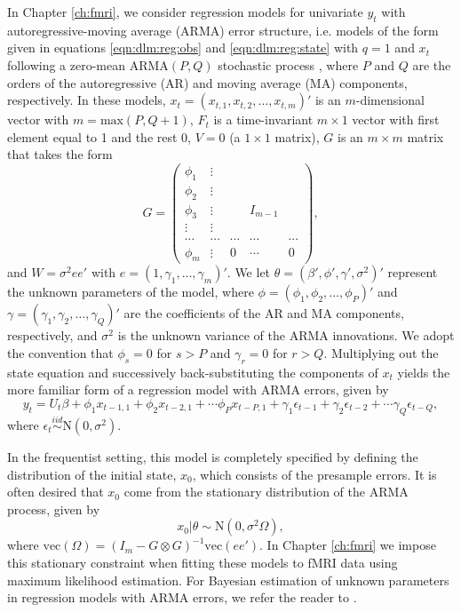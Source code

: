 In Chapter \ref{ch:fmri}, we consider regression models for univariate $y_t$ with autoregressive-moving average (ARMA) error structure, i.e. models of the form given in equations \eqref{eqn:dlm:reg:obs} and \eqref{eqn:dlm:reg:state} with $q = 1$ and $x_t$ following a zero-mean $\mbox{ARMA}(P, Q)$ stochastic process \citep{shum:stof:2006:timeseries}, where $P$ and $Q$ are the orders of the autoregressive (AR) and moving average (MA) components, respectively. In these models, $x_t = (x_{t,1} ,x_{t,2}, \ldots, x_{t,m})'$ is an $m$-dimensional vector with $m = \mbox{max}(P,Q+1)$, $F_t$ is a time-invariant $m \times 1$ vector with first element equal to 1 and the rest 0, $V = 0$ (a $1 \times 1$ matrix), $G$ is an $m \times m$ matrix that takes the form
\begin{equation}
G = \left(
 \begin{array}{ccccc}
 \phi_1 & \vdots \\
 \phi_2 & \vdots \\
 \phi_3 & \vdots && I_{m-1} \\
 \vdots & \vdots \\
 \cdots & \cdots & \cdots & \cdots & \cdots \\
 \phi_m &\vdots & 0 & \cdots & 0
 \end{array}
\right), \label{eqn:dlm:ar:G}
\end{equation}
and $W = \sigma^2ee'$ with $e = (1, \gamma_1, \ldots, \gamma_m)'$. We let $\theta = (\beta', \phi', \gamma', \sigma^2)'$ represent the unknown parameters of the model, where $\phi = (\phi_1,\phi_2,\ldots,\phi_P)'$ and $\gamma = (\gamma_1,\gamma_2,\ldots,\gamma_Q)'$ are the coefficients of the AR and MA components, respectively, and $\sigma^2$ is the unknown variance of the ARMA innovations. We adopt the convention that $\phi_s = 0$ for $s > P$ and $\gamma_r = 0$ for $r > Q$. Multiplying out the state equation and successively back-substituting the components of $x_t$ \cite[see Sec 3.2.5,][]{petris:camp:2009:dynamic} yields the more familiar form of a regression model with ARMA errors, given by
\begin{equation}
y_t = U_t\beta + \phi_1x_{t-1,1} + \phi_2x_{t-2,1} + \cdots \phi_Px_{t-P,1} + \gamma_1\epsilon_{t-1} + \gamma_2\epsilon_{t-2} + \cdots \gamma_Q\epsilon_{t-Q}, \label{eqn:arma}
\end{equation}
where $\epsilon_t \stackrel{iid}{\sim} \mbox{N}(0,\sigma^2)$.

In the frequentist setting, this model is completely specified by defining the distribution of the initial state, $x_0$, which consists of the presample errors. It is often desired that $x_0$ come from the stationary distribution of the ARMA process, given by
\begin{equation}
x_0|\theta \sim \mbox{N}(0, \sigma^2\Omega), \label{eqn:arma:prior}
\end{equation}
where $\mbox{vec}(\Omega) = (I_m - G\otimes G)^{-1} \mbox{vec}(ee')$. In Chapter \ref{ch:fmri} we impose this stationary constraint when fitting these models to fMRI data using maximum likelihood estimation. For Bayesian estimation of unknown parameters in regression models with ARMA errors, we refer the reader to \citet{chib:greenberg:1994:arma}.

